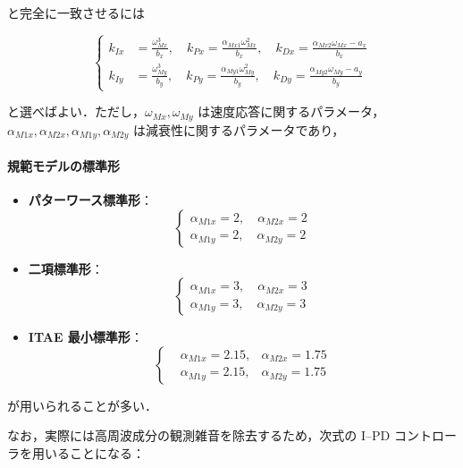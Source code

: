 と完全に一致させるには

\begin{equation}
\left\{
\begin{aligned}
k_{Ix} &= \frac{\omega_{Mx}^3}{b_x}, \quad k_{Px} = \frac{\alpha_{Mx1} \omega_{Mx}^2}{b_x}, \quad k_{Dx} = \frac{\alpha_{Mx2} \omega_{Mx} - a_x}{b_x} \\
k_{Iy} &= \frac{\omega_{My}^3}{b_y}, \quad k_{Py} = \frac{\alpha_{My1} \omega_{My}^2}{b_y}, \quad k_{Dy} = \frac{\alpha_{My2} \omega_{My} - a_y}{b_y}
\end{aligned}
\right.
\tag{5.15}
\end{equation}

と選べばよい．ただし，\(\omega_{Mx}, \omega_{My}\) は速度応答に関するパラメータ，\(\alpha_{M1x}, \alpha_{M2x}, \alpha_{M1y}, \alpha_{M2y}\) は減衰性に関するパラメータであり，

\paragraph{規範モデルの標準形}
\begin{itemize}
    \item \textbf{パターワース標準形}：
    \[
    \left\{
    \begin{aligned}
        \alpha_{M1x} = 2, \quad \alpha_{M2x} = 2 \\
        \alpha_{M1y} = 2, \quad \alpha_{M2y} = 2
    \end{aligned}
    \right.
    \]
    
    \item \textbf{二項標準形}：
    \[
    \left\{
    \begin{aligned}
        \alpha_{M1x} = 3, \quad \alpha_{M2x} = 3 \\
        \alpha_{M1y} = 3, \quad \alpha_{M2y} = 3
    \end{aligned}
    \right.
    \]
    
    \item \textbf{ITAE 最小標準形}：
    \[
    \left\{
    \begin{aligned}
        &\alpha_{M1x} = 2.15, &\alpha_{M2x} = 1.75\\
        &\alpha_{M1y} = 2.15, &\alpha_{M2y} = 1.75
    \end{aligned}
    \right.
    \]
\end{itemize}

\noindent
が用いられることが多い．

\bigskip

\noindent
なお，実際には高周波成分の観測雑音を除去するため，次式の I--PD コントローラを用いることになる：

